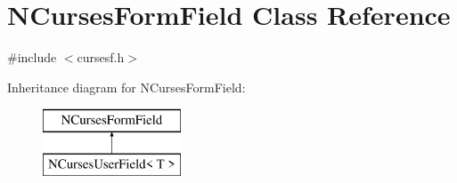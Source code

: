 \hypertarget{class_n_curses_form_field}{\section{N\-Curses\-Form\-Field Class Reference}
\label{class_n_curses_form_field}
}


{\ttfamily \#include $<$cursesf.\-h$>$}

Inheritance diagram for N\-Curses\-Form\-Field\-:\begin{figure}[H]
\begin{center}
\leavevmode
\includegraphics[height=2.000000cm]{class_n_curses_form_field}
\end{center}
\end{figure}
